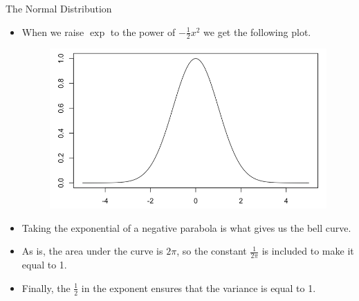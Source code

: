 \documentclass[handout]{beamer}
\begin{document}
\begin{frame}{The Normal Distribution}

\scriptsize{
\begin{itemize}
 \item When we raise $\exp$ to the power of $-\frac{1}{2}x^2$ we get the following plot.
 
   \begin{figure}[h!]
	\centering
	\includegraphics[scale=0.2]{pics/gauss_exp2.png}
\end{figure}
 
 \item Taking the exponential of a negative parabola is what gives us the bell curve. 
 \item As is, the area under the curve is $2\pi$, so the constant $\frac{1}{2\pi}$ is included to make it equal to 1.
 \item Finally, the $\frac{1}{2}$ in the exponent ensures that the variance is equal to 1. 
 \end{itemize}

}
\end{frame}
\end{document}
